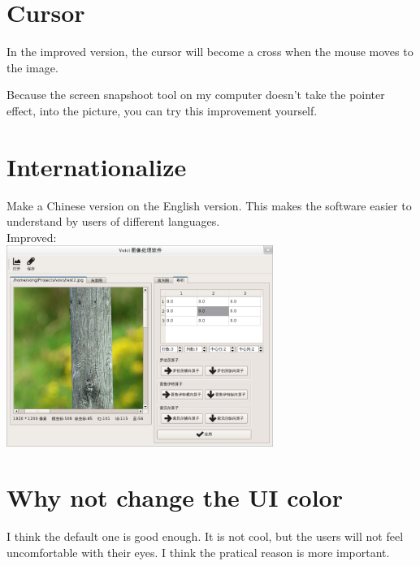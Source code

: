 \documentclass[10pt,a4paper]{article}
\begin{document}
\pagebreak

\section{Cursor}
In the improved version, the cursor will become a cross when the mouse moves to the image.

Because the screen snapshoot tool on my computer doesn't take the pointer effect, into the picture, you can try this improvement yourself.

\section{Internationalize}
Make a Chinese version on the English version. This makes the software easier to understand by users of different languages.\\

Improved:\\
\indent\includegraphics[width=0.65\textwidth]{chinese_improved.png}

\section{Why not change the UI color}
I think the default one is good enough. It is not cool, but the users will not feel uncomfortable with their eyes. I think the pratical reason is more important.
\end{document}
